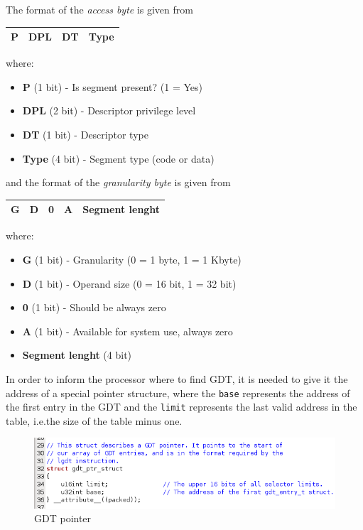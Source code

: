 \documentclass{report}
\begin{document}
The format of the \emph{access byte} is given from
\begin{center}
\begin{tabular}{|c|c|c|c|}
\hline 
P & DPL & DT & Type \\ 
\hline 
\end{tabular}
\end{center}
where:
\begin{itemize}
\item \textbf{P} (1 bit) - Is segment present? (1 = Yes)
\item \textbf{DPL} (2 bit) - Descriptor privilege level
\item \textbf{DT} (1 bit) - Descriptor type
\item \textbf{Type} (4 bit) - Segment type (code or data)
\end{itemize}
and the format of the \emph{granularity byte} is given from
\begin{center}
\begin{tabular}{|c|c|c|c|c|}
\hline 
G & D & 0 & A & Segment lenght \\ 
\hline 
\end{tabular}
\end{center}
where:
\begin{itemize}
\item \textbf{G} (1 bit) - Granularity (0 = 1 byte, 1 = 1 Kbyte)
\item \textbf{D} (1 bit) - Operand size (0 = 16 bit, 1 = 32 bit)
\item \textbf{0} (1 bit) - Should be always zero
\item \textbf{A} (1 bit) - Available for system use, always zero
\item \textbf{Segment lenght} (4 bit)
\end{itemize}

In order to inform the processor where to find GDT, it is needed to give it the address of a special pointer structure, where the \texttt{base} represents the address of the first entry in the GDT and the \texttt{limit} represents the last valid address in the table, i.e.\@ the size of the table minus one. 

\begin{figure}[hbtp]
\centering
\includegraphics[scale=0.4]{images/es02/gdt_ptr.png}
\caption{GDT pointer}
\end{figure}
\end{document}
